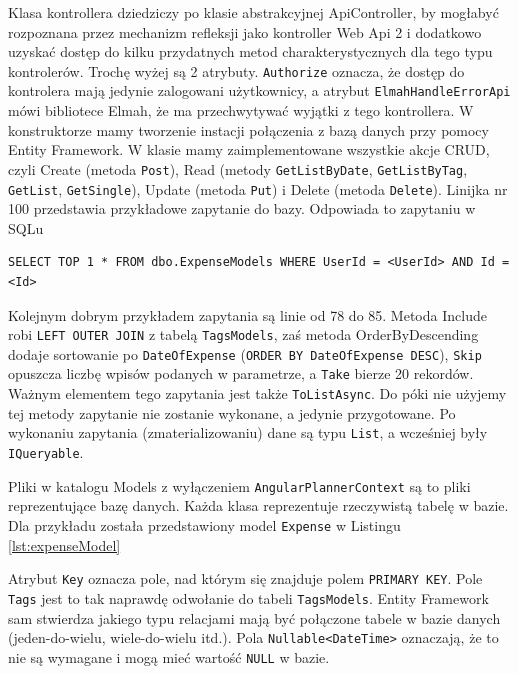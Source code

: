 \documentclass[10pt,titlepage]{article}
\begin{document}

\par Klasa kontrollera dziedziczy po klasie abstrakcyjnej ApiController, by mogłabyć rozpoznana przez mechanizm refleksji jako kontroller Web Api 2 i dodatkowo uzyskać dostęp do kilku przydatnych metod charakterystycznych dla tego typu kontrolerów. Trochę wyżej są 2 atrybuty. \verb|Authorize| oznacza, że dostęp do kontrolera mają jedynie zalogowani użytkownicy, a atrybut \verb|ElmahHandleErrorApi| mówi bibliotece Elmah, że ma przechwytywać wyjątki z tego kontrollera. W konstruktorze mamy tworzenie instacji połączenia z bazą danych przy pomocy Entity Framework. W klasie mamy zaimplementowane wszystkie akcje CRUD, czyli Create (metoda \verb|Post|), Read (metody \verb|GetListByDate|, \verb|GetListByTag|, \verb|GetList|, \verb|GetSingle|), Update (metoda \verb|Put|) i Delete (metoda \verb|Delete|). Linijka nr 100 przedstawia przykładowe zapytanie do bazy. Odpowiada to zapytaniu w SQLu
\begin{verbatim}
SELECT TOP 1 * FROM dbo.ExpenseModels WHERE UserId = <UserId> AND Id = <Id>
\end{verbatim}
Kolejnym dobrym przykładem zapytania są linie od 78 do 85. Metoda Include robi \verb|LEFT OUTER JOIN| z tabelą \verb|TagsModels|, zaś metoda OrderByDescending dodaje sortowanie po \verb|DateOfExpense| (\verb|ORDER BY DateOfExpense DESC|), \verb|Skip| opuszcza liczbę wpisów podanych w parametrze, a \verb|Take| bierze 20 rekordów. Ważnym elementem tego zapytania jest także \verb|ToListAsync|. Do póki nie użyjemy tej metody zapytanie nie zostanie wykonane, a jedynie przygotowane. Po wykonaniu zapytania (zmaterializowaniu) dane są typu \verb|List|, a wcześniej były \verb|IQueryable|.

\par Pliki w katalogu Models z wyłączeniem \verb|AngularPlannerContext| są to pliki reprezentujące bazę danych. Każda klasa reprezentuje rzeczywistą tabelę w bazie. Dla przykładu została przedstawiony model \verb|Expense| w Listingu \ref{lst:expenseModel}

Atrybut \verb|Key| oznacza pole, nad którym się znajduje polem \verb|PRIMARY KEY|. Pole \verb|Tags| jest to tak naprawdę odwołanie do tabeli \verb|TagsModels|. Entity Framework sam stwierdza jakiego typu relacjami mają być połączone tabele w bazie danych (jeden-do-wielu, wiele-do-wielu itd.). Pola \verb|Nullable<DateTime>| oznaczają, że to nie są wymagane i mogą mieć wartość \verb|NULL| w bazie.
\end{document}
